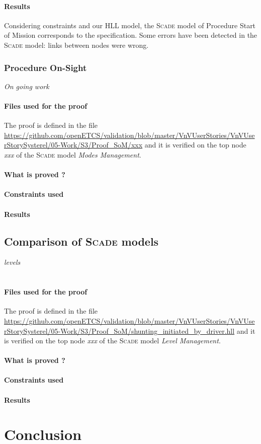 \documentclass{article}
\newcommand{\HLL}{{HLL}}
\newcommand{\SCADE}{\textsc{Scade}}
\begin{document}
\paragraph{Results}
Considering constraints and our \HLL{} model, the \SCADE{} model of Procedure
Start of Mission corresponds to the specification.
Some errors have been detected in the \SCADE{} model: links between nodes were wrong.

\subsubsection{Procedure On-Sight}
\emph{On going work}


\paragraph{Files used for the proof} The proof is defined in the file \url{https://github.com/openETCS/validation/blob/master/VnVUserStories/VnVUserStorySysterel/05-Work/S3/Proof_SoM/xxx} and it is verified on the top node \emph{xxx} of the \SCADE{} model \emph{Modes Management}.

\paragraph{What is proved ?}


\paragraph{Constraints used}


\paragraph{Results}


\subsection{Comparison of \SCADE{} models}

\emph{levels}\\
\\

\paragraph{Files used for the proof} The proof is defined in the file \url{https://github.com/openETCS/validation/blob/master/VnVUserStories/VnVUserStorySysterel/05-Work/S3/Proof_SoM/shunting_initiated_by_driver.hll} and it is verified on the top node \emph{xxx} of the \SCADE{} model \emph{Level Management}.

\paragraph{What is proved ?}


\paragraph{Constraints used}


\paragraph{Results}


\section{Conclusion}
\end{document}
